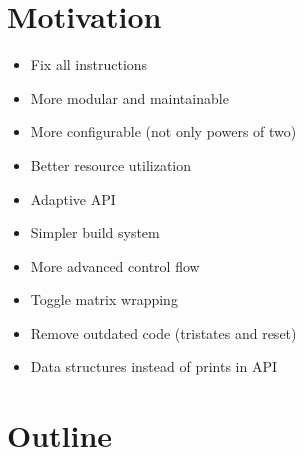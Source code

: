 \TODO

\section{Motivation}


\begin{itemize}
    \item Fix all instructions
    \item More modular and maintainable
    \item More configurable (not only powers of two)
    \item Better resource utilization
    \item Adaptive API
    \item Simpler build system
    \item More advanced control flow
    \item Toggle matrix wrapping
    \item Remove outdated code (tristates and reset)
    \item Data structures instead of prints in API
\end{itemize}

\section{Outline}

\TODO
